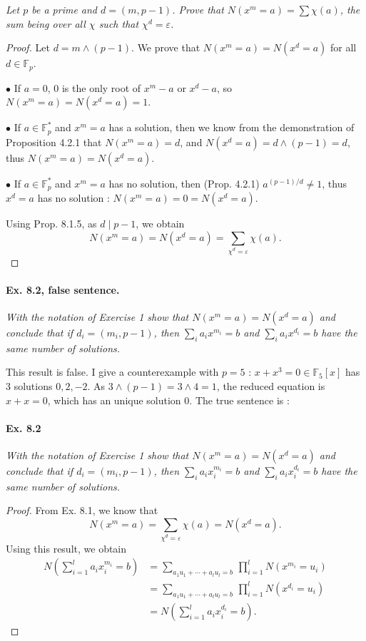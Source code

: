 \documentclass[11pt,a4paper]{article}
\newcommand{\F}{\mathbb{F}}
\begin{document}
{{\it Let $p$ be a prime and $d=(m,p-1)$. Prove that $N(x^m = a) =\sum \chi(a)$, the sum being over all $\chi$ such that $\chi^d = \varepsilon$.
}

\begin{proof}
Let $d = m\wedge (p-1)$. We prove that $N(x^m =a) = N(x^d = a)$ for all $d \in \F_p$.

$\bullet$ If $a = 0$, $0$ is the only root of $x^m -a$ or $x^d -a$, so  $N(x^m = a) = N(x^d = a) = 1$.

$\bullet$ If $a \in \F_p^*$ and $x^m = a$ has a solution, then we know from the demonstration of Proposition 4.2.1 that $N(x^m = a) = d$, and $N(x^d = a) = d \wedge (p-1) = d$, thus $N(x^m = a) = N(x^d =a)$.

$\bullet$ If $a \in \F_p^*$ and $x^m = a$ has no solution, then (Prop. 4.2.1) $a^{(p-1)/d} \ne 1$, thus $x^d = a$ has no solution : $N(x^m = a) = 0 = N(x^d =a)$.

Using Prop. 8.1.5, as $d \mid p-1$, we obtain
$$N(x^m =a) = N(x^d = a) = \sum_{\chi^d = \varepsilon} \chi(a).$$
\end{proof}

\paragraph{Ex. 8.2, false sentence.}

{\it With the notation of Exercise 1 show that $N(x^m = a) = N(x^d = a)$ and conclude that if $d_i = (m_i,p-1)$, then $\sum_i a_ix^{m_i} = b$ and $\sum_i a_i x^{d_i} = b$ have the same number of solutions.
}

\bigskip

This result is false. I give a counterexample with $p=5$ :  $x + x^3 =0 \in \F_5[x]$ has 3 solutions $0,2,-2$.  As $3\wedge (p-1) = 3 \wedge 4 = 1$, the reduced equation is $x + x = 0$, which has an unique solution $0$. The true sentence is :

\bigskip\paragraph{Ex. 8.2}
{\it With the notation of Exercise 1 show that $N(x^m = a) = N(x^d = a)$ and conclude that if $d_i = (m_i,p-1)$, then $\sum_i a_ix_i^{m_i} = b$ and $\sum_i a_i x_i^{d_i} = b$ have the same number of solutions.
}

\begin{proof}
From Ex. 8.1, we know that
$$N(x^m=a) = \sum_{\chi^d=\varepsilon} \chi(a) = N(x^d=a).$$
Using this result, we obtain
\begin{align*}
N\left(\sum\limits_{i=1}^l a_i x_i^{m_i} = b\right) &= \sum\limits_{a_1u_1+\cdots+a_l u_l= b}\, \prod\limits_{i=1}^l N(x^{m_i} = u_i)\\
&= \sum\limits_{a_1u_1+\cdots+a_l u_l= b}\, \prod\limits_{i=1}^l N(x^{d_i} = u_i)\\
&=N\left(\sum\limits_{i=1}^l a_i x_i^{d_i} = b\right).
\end{align*}
\end{proof}

}
\end{document}
